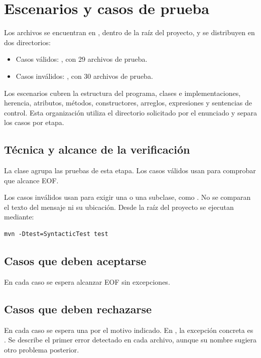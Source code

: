 \endgroup

\clearpage
\section{Escenarios y casos de prueba}
\begingroup
\setlength{\emergencystretch}{3em}
Los archivos se encuentran en , dentro de la raíz del
proyecto, y se distribuyen en dos directorios:
\begin{itemize}[leftmargin=*]
  \item Casos válidos: , con 29 archivos de prueba.
  \item Casos inválidos: , con 30 archivos de prueba.
\end{itemize}
Los escenarios cubren la estructura del programa, clases e implementaciones,
herencia, atributos, métodos, constructores, arreglos, expresiones y
sentencias de control. Esta organización utiliza el directorio
 solicitado por el enunciado y separa los casos por etapa.

\subsection{Técnica y alcance de la verificación}
La clase  agrupa las pruebas de esta etapa.
Los casos válidos usan  para comprobar que
 alcance EOF.

Los casos inválidos usan  para exigir una
 o una subclase, como
. No se comparan el texto del
mensaje ni su ubicación.
Desde la raíz del proyecto se ejecutan mediante:
\begin{verbatim}
mvn -Dtest=SyntacticTest test
\end{verbatim}

\subsection{Casos que deben aceptarse}
En cada caso se espera alcanzar EOF sin excepciones.


\subsection{Casos que deben rechazarse}
En cada caso se espera una  por el motivo
indicado. En , la excepción concreta es
.
Se describe el primer error detectado en cada archivo, aunque su nombre
sugiera otro problema posterior.

\endgroup
